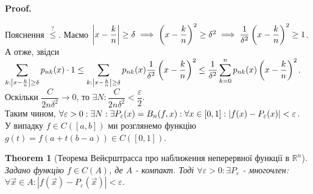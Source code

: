 \documentclass[a4paper, 10pt]{article}
\makeatletter
\def\qed{$\blacksquare$}
\theoremstyle{theoremdd}
\newtheorem{theorem}{Theorem}[subsection]
\theoremstyle{theoremdd}
\theoremstyle{theoremdd}
\theoremstyle{theoremdd}
\theoremstyle{theoremdd}
\theoremstyle{theoremdd}
\theoremstyle{theoremdd}
\theoremstyle{theoremdd}
\renewenvironment{proof}[1][Proof.\\]{\par
\pushQED{\hfill \qed}%
\normalfont \topsep6\p@\@plus6\p@\relax
\trivlist
\item\relax
{\bfseries
#1\@addpunct{.}}\hspace\labelsep\ignorespaces
}{%
\popQED\endtrivlist\@endpefalse
}
\makeatother
\begin{document}
\begin{proof}
Пояснення $\overset{?}{\leq}$. Маємо $\abs{x - \dfrac{k}{n}} \geq \delta \implies \left( x - \dfrac{k}{n} \right)^2 \geq \delta^2 \implies \dfrac{1}{\delta^2} \left( x - \dfrac{k}{n} \right)^2 \geq 1$. А отже, звідси\\
$\displaystyle\sum_{k: \abs{x - \frac{k}{n}} \geq \delta} p_{nk}(x) \cdot 1 \leq \sum_{k: \abs{x - \frac{k}{n}} \geq \delta} p_{nk}(x) \dfrac{1}{\delta^2} \left( x - \dfrac{k}{n} \right)^2 \leq \dfrac{1}{\delta^2} \sum_{k=0}^n p_{nk}(x) \left( x - \dfrac{k}{n} \right)^2$.\\
Оскільки $\dfrac{C}{2n\delta^2} \to 0$, то $\exists N: \dfrac{C}{2n\delta^2} < \dfrac{\varepsilon}{2}$.\\
Таким чином, $\forall \varepsilon > 0: \exists N: \exists P_\varepsilon(x) = B_n(f,x): \forall x \in [0,1]: \\ |f(x)- P_{\varepsilon}(x)| < \varepsilon$.
\bigskip \\
У випадку $f \in C([a,b])$ ми розглянемо функцію $g(t) = f(a+t(b-a)) \in C([0,1])$.
\end{proof}

\begin{theorem}[Теорема Вейєрштрасса про наближення неперервної функції в $\mathbb{R}^n$]
Задано функцію $f \in C(A)$, де $A$ - компакт. Тоді $\forall \varepsilon > 0: \exists P_\varepsilon$ - многочлен: $\forall \vec{x} \in A: |f(\vec{x}) - P_\varepsilon(\vec{x})| < \varepsilon$.
\end{theorem}
\end{document}
